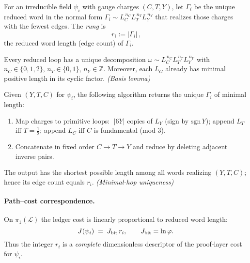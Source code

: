 \documentclass[11pt]{article}
\begin{document}
\begin{proposition}
\begin{definition}
For an irreducible field \(\psi_i\) with gauge charges \((C,T,Y)\), let \(\Gamma_i\) be the unique reduced word in the normal form
\(
\Gamma_i \sim L_C^{\,n_C} L_T^{\,n_T} L_Y^{\,n_Y}
\)
that realizes those charges with the fewest edges. The \emph{rung} is
\[
\boxed{\,r_i := |\Gamma_i|\,},
\]
the reduced word length (edge count) of \(\Gamma_i\).
\end{definition}

\begin{lemma}
Every reduced loop has a unique decomposition
\(
\omega \sim L_C^{\,n_C} L_T^{\,n_T} L_Y^{\,n_Y}
\)
with \(n_C\in\{0,1,2\}\), \(n_T\in\{0,1\}\), \(n_Y\in\mathbb Z\). Moreover, each \(L_G\) already has minimal positive length in its cyclic factor. \hfill\emph{(Basis lemma)}
\end{lemma}

\begin{theorem}
Given \((Y,T,C)\) for \(\psi_i\), the following algorithm returns the unique \(\Gamma_i\) of minimal length:
\begin{enumerate}
\item Map charges to primitive loops:
\(\;|6Y|\) copies of \(L_Y\) (sign by \(\mathrm{sgn}\,Y\));
append \(L_T\) iff \(T=\tfrac12\);
append \(L_C\) iff \(C\) is fundamental (mod \(3\)).
\item Concatenate in fixed order \(C\!\to\!T\!\to\!Y\) and reduce by deleting adjacent inverse pairs.
\end{enumerate}
The output has the shortest possible length among all words realizing \((Y,T,C)\); hence its edge count equals \(r_i\).
\hfill\emph{(Minimal‑hop uniqueness)}
\end{theorem}

\paragraph{Path–cost correspondence.}
On \(\pi_1(\mathscr L)\) the ledger cost is linearly proportional to reduced word length:
\[
J(\psi_i) \;=\; J_{\rm bit}\, r_i,\qquad J_{\rm bit}=\ln\varphi.
\]
Thus the integer \(r_i\) is a \emph{complete} dimensionless descriptor of the proof‑layer cost for \(\psi_i\).%


\end{proposition}
\end{document}
